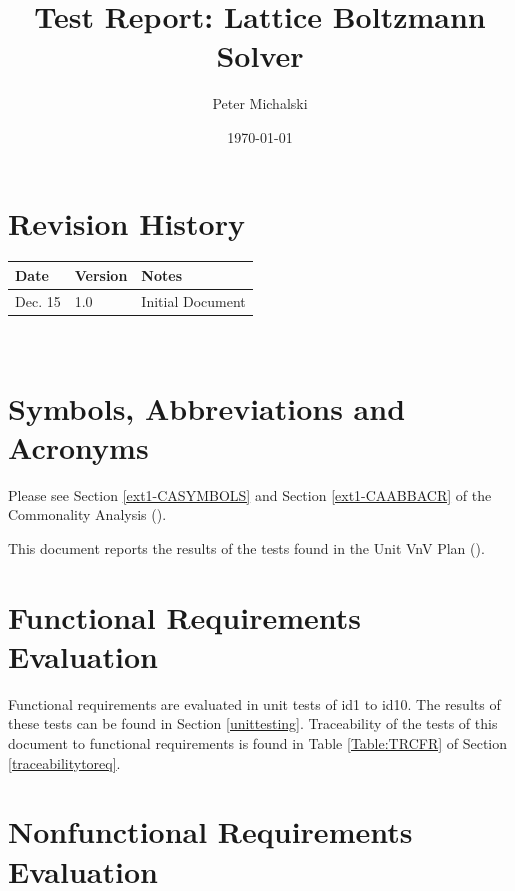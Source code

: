 \documentclass[12pt, titlepage]{article}
\newcommand{\myprogname}{Lattice Boltzmann Solver}
\begin{document}
\title{Test Report: \myprogname} 
\author{Peter Michalski}
\date{\today}
	
\maketitle


\section{Revision History}

\begin{tabularx}{\textwidth}{p{3cm}p{2cm}X}
\toprule {\bf Date} & {\bf Version} & {\bf Notes}\\
\midrule
Dec. 15 & 1.0 & Initial Document\\
\bottomrule
\end{tabularx}

~\newpage

\section{Symbols, Abbreviations and Acronyms}

Please see Section \ref{ext1-CASYMBOLS} and Section \ref{ext1-CAABBACR} of the Commonality Analysis (\citet{LBM_CA_PM}).

\newpage

\tableofcontents

\listoftables %

\listoffigures %

\newpage


This document reports the results of the tests found in the Unit VnV Plan (\citet{LBM_UVNV_PM}).

\section{Functional Requirements Evaluation}

Functional requirements are evaluated in unit tests of id1 to id10. The results of these tests can be found in Section \ref{unittesting}. Traceability of the tests of this document to functional requirements is found in Table \ref{Table:TRCFR} of Section \ref{traceabilitytoreq}. 



\section{Nonfunctional Requirements Evaluation}
\end{document}

